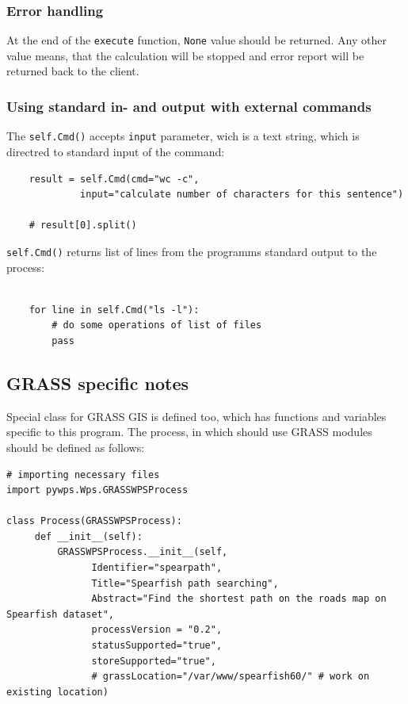 \documentclass[a4paper,11pt]{article}
\begin{document}
\subsubsection{Error handling}
    
At the end of the \texttt{execute} function, \texttt{None} value should be returned. Any other 
value means, that the calculation will be stopped and error report will be returned back to the client.
    

\subsubsection{Using standard in- and output with external commands}
The \texttt{self.Cmd()} accepts \texttt{input} parameter, wich is a text
string, which is directred to standard input of the command:

\begin{verbatim}
    result = self.Cmd(cmd="wc -c",
             input="calculate number of characters for this sentence")

    # result[0].split()
\end{verbatim}

\texttt{self.Cmd()} returns list of lines from the programms standard
output to the process:

\begin{verbatim}

    for line in self.Cmd("ls -l"):
        # do some operations of list of files
        pass
\end{verbatim}


\subsection{GRASS specific notes}

Special class for GRASS GIS is defined too, which has functions and
variables specific to this program. The process, in which should use GRASS
modules should be defined as follows:

\begin{verbatim}
# importing necessary files
import pywps.Wps.GRASSWPSProcess

class Process(GRASSWPSProcess):
     def __init__(self):
         GRASSWPSProcess.__init__(self,
               Identifier="spearpath",
               Title="Spearfish path searching",
               Abstract="Find the shortest path on the roads map on Spearfish dataset",
               processVersion = "0.2",
               statusSupported="true",
               storeSupported="true",
               # grassLocation="/var/www/spearfish60/" # work on existing location)
\end{verbatim}
\end{document}

